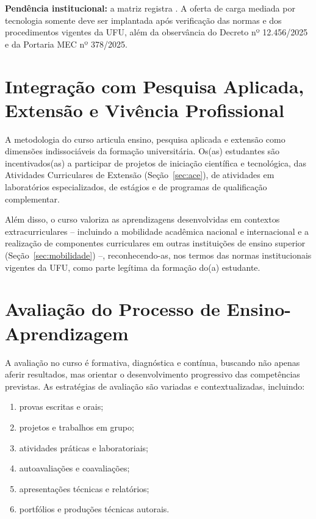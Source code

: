 \textbf{Pendência institucional:} a matriz registra . A oferta de carga mediada por tecnologia somente deve ser implantada após verificação das normas e dos procedimentos vigentes da UFU, além da observância do Decreto nº 12.456/2025 e da Portaria MEC nº 378/2025.

\section{Integração com Pesquisa Aplicada, Extensão e Vivência Profissional}

A metodologia do curso articula ensino, pesquisa aplicada e extensão como dimensões indissociáveis da formação universitária. Os(as) estudantes são incentivados(as) a participar de projetos de iniciação científica e tecnológica, das Atividades Curriculares de Extensão (Seção~\ref{sec:ace}), de atividades em laboratórios especializados, de estágios e de programas de qualificação complementar.

Além disso, o curso valoriza as aprendizagens desenvolvidas em contextos extracurriculares -- incluindo a mobilidade acadêmica nacional e internacional e a realização de componentes curriculares em outras instituições de ensino superior (Seção~\ref{sec:mobilidade}) --, reconhecendo-as, nos termos das normas institucionais vigentes da UFU, como parte legítima da formação do(a) estudante.

\section{Avaliação do Processo de Ensino-Aprendizagem}

A avaliação no curso é formativa, diagnóstica e contínua, buscando não apenas aferir resultados, mas orientar o desenvolvimento progressivo das competências previstas. As estratégias de avaliação são variadas e contextualizadas, incluindo:

\begin{enumerate}
    \item provas escritas e orais;
    \item projetos e trabalhos em grupo;
    \item atividades práticas e laboratoriais;
    \item autoavaliações e coavaliações;
    \item apresentações técnicas e relatórios;
    \item portfólios e produções técnicas autorais.
\end{enumerate}

